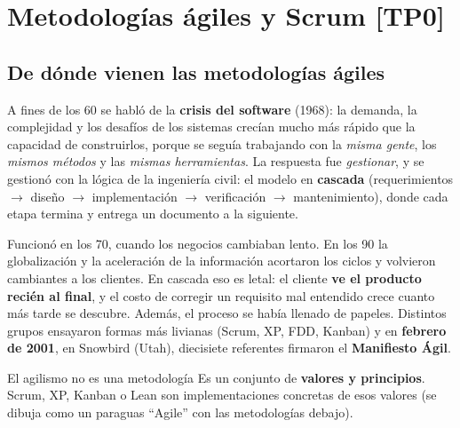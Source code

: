 \documentclass[11pt,a4paper]{article}
\begin{document}
\section[Metodologías ágiles y Scrum]{Metodologías ágiles y Scrum \hfill {\normalsize [TP0]}}
\label{sec:scrum}
\subsection{De dónde vienen las metodologías ágiles}
A fines de los 60 se habló de la \textbf{crisis del software} (1968): la demanda, la
complejidad y los desafíos de los sistemas crecían mucho más rápido que la capacidad de construirlos, porque se
seguía trabajando con la \emph{misma gente}, los \emph{mismos métodos} y las \emph{mismas herramientas}. La
respuesta fue \emph{gestionar}, y se gestionó con la lógica de la ingeniería civil: el modelo en
\textbf{cascada} (requerimientos $\to$ diseño $\to$ implementación $\to$ verificación $\to$ mantenimiento), donde
cada etapa termina y entrega un documento a la siguiente.

Funcionó en los 70, cuando los negocios cambiaban lento. En los 90 la globalización y la aceleración de la
información acortaron los ciclos y volvieron cambiantes a los clientes. En cascada eso es letal: el cliente
\textbf{ve el producto recién al final}, y el costo de corregir un requisito mal entendido crece cuanto más
tarde se descubre. Además, el proceso se había llenado de papeles. Distintos grupos ensayaron formas más
livianas (Scrum, XP, FDD, Kanban) y en \textbf{febrero de 2001}, en Snowbird (Utah), diecisiete referentes
firmaron el \textbf{Manifiesto Ágil}.

\begin{aviso}{El agilismo no es una metodología}
Es un conjunto de \textbf{valores y principios}. Scrum, XP, Kanban o Lean son implementaciones concretas de
esos valores (se dibuja como un paraguas ``Agile'' con las metodologías debajo).
\end{aviso}
\end{document}
